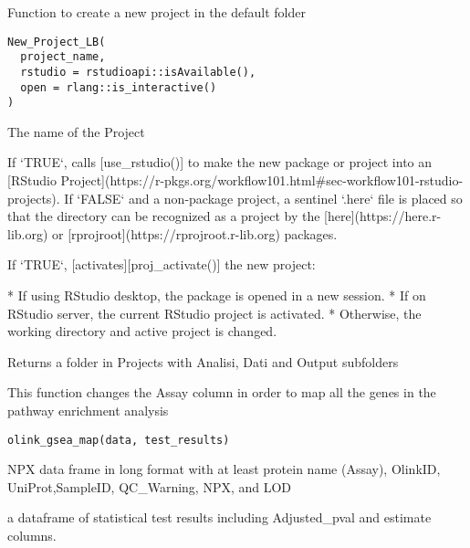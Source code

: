\documentclass[a4paper]{book}
\begin{document}
%
\begin{Description}
Function to create a new project in the default folder
\end{Description}
%
\begin{Usage}
\begin{verbatim}
New_Project_LB(
  project_name,
  rstudio = rstudioapi::isAvailable(),
  open = rlang::is_interactive()
)
\end{verbatim}
\end{Usage}
%
\begin{Arguments}
\begin{ldescription}
\item[\code{project\_name}] The name of the Project

\item[\code{rstudio}] If `TRUE`, calls [use\_rstudio()] to make the new package or
project into an [RStudio
Project](https://r-pkgs.org/workflow101.html\#sec-workflow101-rstudio-projects).
If `FALSE` and a non-package project, a sentinel `.here` file is placed so
that the directory can be recognized as a project by the
[here](https://here.r-lib.org) or
[rprojroot](https://rprojroot.r-lib.org) packages.

\item[\code{open}] If `TRUE`, [activates][proj\_activate()] the new project:

* If using RStudio desktop, the package is opened in a new session.
* If on RStudio server, the current RStudio project is activated.
* Otherwise, the working directory and active project is changed.
\end{ldescription}
\end{Arguments}
%
\begin{Value}
Returns a folder in Projects with Analisi, Dati and Output subfolders
\end{Value}
%
\begin{Description}
This function changes the Assay column in order to map all the genes in the pathway enrichment analysis
\end{Description}
%
\begin{Usage}
\begin{verbatim}
olink_gsea_map(data, test_results)
\end{verbatim}
\end{Usage}
%
\begin{Arguments}
\begin{ldescription}
\item[\code{data}] NPX data frame in long format with at least protein name (Assay), OlinkID, UniProt,SampleID, QC\_Warning, NPX, and LOD

\item[\code{test\_results}] a dataframe of statistical test results including Adjusted\_pval and estimate columns.
\end{ldescription}
\end{Arguments}
\end{document}
